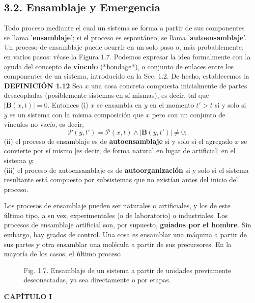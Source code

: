 {\fontsize{13}{15}\selectfont
\subsection*{3.2. Ensamblaje y Emergencia}
Todo proceso mediante el cual un sistema se forma a partir de sus componentes se llama '\textbf{ensamblaje}'; si el proceso es espontáneo, se llama '\textbf{autoensamblaje}'. Un proceso de ensamblaje puede ocurrir en un solo paso o, más probablemente, en varios pasos: véase la Figura 1.7. Podemos expresar la idea formalmente con la ayuda del concepto de \textbf{vínculo} (*bondage*), o conjunto de enlaces entre los componentes de un sistema, introducido en la Sec. 1.2. De hecho, establecemos la
\\
\textbf{DEFINICIÓN 1.12} Sea $x$ una cosa concreta compuesta inicialmente de partes desacopladas (posiblemente sistemas en sí mismas), es decir, tal que $|\mathbf{B}(x, t)| = 0$. Entonces
(i) $x$ se ensambla en $y$ en el momento $t' > t$ si y solo si $y$ es un sistema con la misma composición que $x$ pero con un conjunto de vínculos no vacío, es decir,
$$ \mathcal{P}(y, t') = \mathcal{P}(x, t) \land |\mathbf{B}(y, t')| \ne 0; $$
(ii) el proceso de ensamblaje es de \textbf{autoensamblaje} si y solo si el agregado $x$ se convierte por sí mismo [es decir, de forma natural en lugar de artificial] en el sistema $y$;
\\
(iii) el proceso de autoensamblaje es de \textbf{autoorganización} si y solo si el sistema resultante está compuesto por subsistemas que no existían antes del inicio del proceso.

Los procesos de ensamblaje pueden ser naturales o artificiales, y los de este último tipo, a su vez, experimentales (o de laboratorio) o industriales. Los procesos de ensamblaje artificial son, por supuesto, \textbf{guiados por el hombre}. Sin embargo, hay grados de control. Una cosa es ensamblar una máquina a partir de sus partes y otra ensamblar una molécula a partir de sus precursores. En la mayoría de los casos, el último proceso
}

\begin{figure}[h!]
    \centering

    \caption*{Fig. 1.7. Ensamblaje de un sistema a partir de unidades previamente desconectadas, ya sea directamente o por etapas.}
\end{figure}
\newpage
\fancyhf{}
\fancyhead[l]{\thepage}
\begin{center}
{\fontsize{16}{18}\selectfont \textbf{CAPÍTULO I}}
\end{center}
\vspace{0.5cm}

